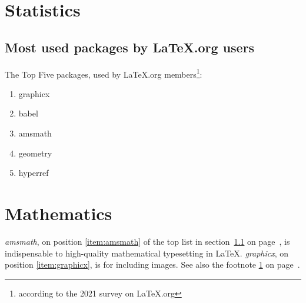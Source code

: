 \documentclass{book}
\begin{document}
\chapter{Statistics}
\section{Most used packages by LaTeX.org users}
\label{sec:packages}
The Top Five packages, used by LaTeX.org
members\footnote{according to the 2021 survey on
LaTeX.org\label{fn:project}}:
\begin{enumerate}
  \item graphicx\label{item:graphicx}
  \item babel
  \item amsmath\label{item:amsmath}
  \item geometry
  \item hyperref
\end{enumerate}
\chapter{Mathematics}
\emph{amsmath}, on position \ref{item:amsmath}
of the top list in section~\ref{sec:packages} on
page~\pageref{sec:packages}, is indispensable to
high-quality mathematical typesetting in \LaTeX.
\emph{graphicx}, on position \ref{item:graphicx},
is for including images. See also the footnote
\ref{fn:project} on page~\pageref{fn:project}.
\end{document}

